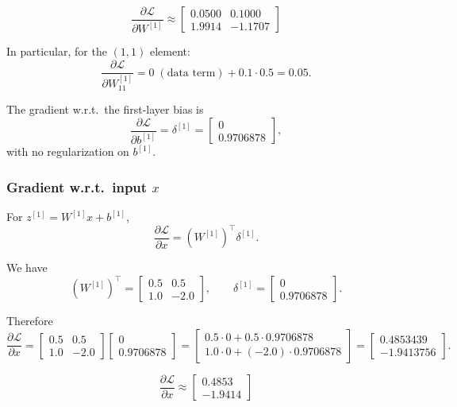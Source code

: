 \documentclass{article}
\begin{document}
\[
\boxed{
	\frac{\partial\mathcal{L}}{\partial W^{[1]}}
	\approx
	\begin{bmatrix}
	0.0500 & 0.1000\\
	1.9914 & -1.1707
	\end{bmatrix}
}
\]

In particular, for the $(1,1)$ element:
\[
\frac{\partial \mathcal{L}}{\partial W^{[1]}_{11}}
= 0 \;(\text{data term}) + 0.1 \cdot 0.5 = 0.05.
\]

The gradient w.r.t.\ the first-layer bias is
\[
\frac{\partial\mathcal{L}}{\partial b^{[1]}} = \delta^{[1]} =
\begin{bmatrix}
0\\
0.9706878
\end{bmatrix},
\]
with no regularization on $b^{[1]}$.

\subsubsection*{Gradient w.r.t.\ input $x$}

For $z^{[1]} = W^{[1]}x + b^{[1]}$,
\[
\frac{\partial\mathcal{L}}{\partial x} = (W^{[1]})^\top \delta^{[1]}.
\]

We have
\[
(W^{[1]})^\top =
\begin{bmatrix}
0.5 & 0.5\\
1.0 & -2.0
\end{bmatrix},\qquad
\delta^{[1]} =
\begin{bmatrix}
0\\
0.9706878
\end{bmatrix}.
\]

Therefore
\[
\frac{\partial\mathcal{L}}{\partial x} =
\begin{bmatrix}
0.5 & 0.5\\
1.0 & -2.0
\end{bmatrix}
\begin{bmatrix}
0\\
0.9706878
\end{bmatrix}
=
\begin{bmatrix}
0.5\cdot 0 + 0.5\cdot 0.9706878\\
1.0\cdot 0 + (-2.0)\cdot 0.9706878
\end{bmatrix}
=
\begin{bmatrix}
0.4853439\\
-1.9413756
\end{bmatrix}.
\]

\[
\boxed{
	\frac{\partial\mathcal{L}}{\partial x}
	\approx
	\begin{bmatrix}
	0.4853\\
	-1.9414
	\end{bmatrix}
}
\]
\end{document}
